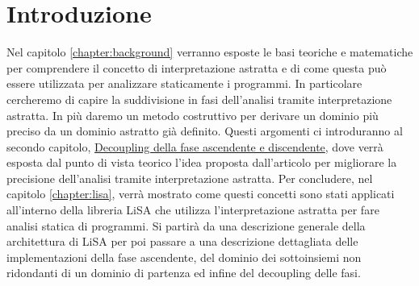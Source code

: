 \chapter*{Introduzione} %

Nel capitolo \ref{chapter:background} verranno esposte le basi teoriche e matematiche per comprendere il concetto di interpretazione astratta e di come questa può essere utilizzata per analizzare staticamente i programmi. In particolare cercheremo di capire la suddivisione in fasi dell'analisi tramite interpretazione astratta. In più daremo un metodo costruttivo per derivare un dominio più preciso da un dominio astratto già definito. Questi argomenti ci introduranno al secondo capitolo, \hyperref[chapter:decoupling]{Decoupling della fase ascendente e discendente}, dove verrà esposta dal punto di vista teorico l'idea proposta dall'articolo \cite{DBLP:conf/aplas/ArceriMZ22} per migliorare la precisione dell'analisi tramite interpretazione astratta. Per concludere, nel capitolo \ref{chapter:lisa}, verrà mostrato come questi concetti sono stati applicati all'interno della libreria LiSA che utilizza l'interpretazione astratta per fare analisi statica di programmi. Si partirà da una descrizione generale della architettura di LiSA per poi passare a una descrizione dettagliata delle implementazioni della fase ascendente, del dominio dei sottoinsiemi non ridondanti di un dominio di partenza ed infine del decoupling delle fasi.